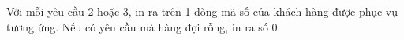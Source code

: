 Với mỗi yêu cầu 2 hoặc 3, in ra trên 1 dòng mã số của khách hàng được phục vụ tương ứng. Nếu có yêu cầu mà hàng đợi rỗng, in ra số 0.  



\
